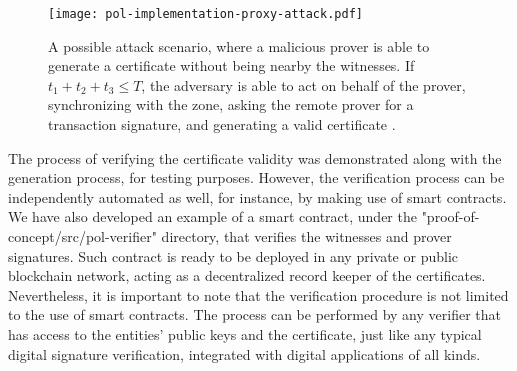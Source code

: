 \begin{figure}[h!]
    \begin{center}
    \texttt{[image: pol-implementation-proxy-attack.pdf]}
    \caption{A possible attack scenario, where a malicious prover is able to generate a \pol{} certificate without being nearby the witnesses. If $t_1 + t_2 + t_3 \leq T$, the adversary is able to act on behalf of the prover, synchronizing with the zone, asking the remote prover for a transaction signature, and generating a valid certificate \cite{nosouhi2020blockchain}.}
    \label{fig:pol-implementation:overview-proxy-wormhole}
    \end{center}
\end{figure}

The process of verifying the certificate validity was demonstrated along with the generation process, for testing purposes. However, the verification process can be independently automated as well, for instance, by making use of smart contracts. We have also developed an example of a smart contract, under the "proof-of-concept/src/pol-verifier" directory, that verifies the witnesses and prover signatures. Such contract is ready to be deployed in any private or public blockchain network, acting as a decentralized record keeper of the \pol{} certificates. Nevertheless, it is important to note that the verification procedure is not limited to the use of smart contracts. The process can be performed by any verifier that has access to the entities' public keys and the \pol{} certificate, just like any typical digital signature verification, integrated with digital applications of all kinds.





